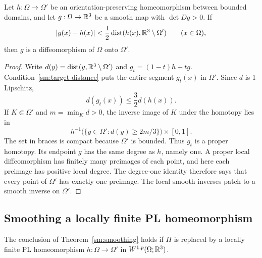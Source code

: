\begin{lemma}
\label{sm:proper-degree}
Let $h:\Omega\to\Omega'$ be an orientation-preserving homeomorphism
between bounded domains, and let $g:\Omega\to\mathbb R^3$ be a smooth
map with $\det Dg>0$.  If
\begin{equation}
 \label{sm:target-distance}
 |g(x)-h(x)|<\frac12\operatorname{dist}(h(x),\mathbb R^3\setminus\Omega')
 \qquad(x\in\Omega),
\end{equation}
then $g$ is a diffeomorphism of $\Omega$ onto $\Omega'$.
\end{lemma}

\begin{proof}
Write $d(y)=\operatorname{dist}(y,\mathbb R^3\setminus\Omega')$ and
$g_t=(1-t)h+tg$.  Condition~\eqref{sm:target-distance} puts the entire
segment $g_t(x)$ in $\Omega'$.  Since $d$ is 1-Lipschitz,
\[
 d(g_t(x))\le\frac32d(h(x)).
\]
If $K\Subset\Omega'$ and $m=\min_Kd>0$, the inverse image of $K$
under the homotopy lies in
\[
 h^{-1}\bigl(\{y\in\Omega':d(y)\ge2m/3\}\bigr)\times[0,1].
\]
The set in braces is compact because $\Omega'$ is bounded.
Thus $g_t$ is a proper homotopy.  Its endpoint $g$ has the same
degree as $h$, namely one.  A proper local diffeomorphism has
finitely many preimages of each point, and here each preimage has
positive local degree.  The degree-one identity therefore says that
every point of $\Omega'$ has exactly one preimage.  The local smooth
inverses patch to a smooth inverse on $\Omega'$.
\end{proof}

\subsection{Smoothing a locally finite PL homeomorphism}

\begin{proposition}
\label{sm:pl-smoothing}
The conclusion of Theorem~\ref{sm:smoothing} holds if $H$ is replaced
by a locally finite PL homeomorphism
$h:\Omega\to\Omega'$ in $W^{1,p}(\Omega;\mathbb R^3)$.
\end{proposition}

